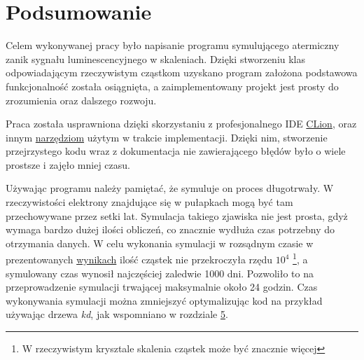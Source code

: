 \chapter{Podsumowanie}

Celem wykonywanej pracy było napisanie programu symulującego atermiczny zanik sygnału luminescencyjnego w skaleniach. Dzięki stworzeniu klas odpowiadającym rzeczywistym cząstkom uzyskano program założona podstawowa funkcjonalność została osiągnięta, a zaimplementowany projekt jest prosty do zrozumienia oraz dalszego rozwoju. 

Praca została usprawniona dzięki skorzystaniu z profesjonalnego IDE \hyperref[tech:clion]{CLion}, oraz innym \hyperref[tech:all]{narzędziom} użytym w trakcie implementacji. Dzięki nim, stworzenie przejrzystego kodu wraz z dokumentacja nie zawierającego błędów było o wiele prostsze i zajęło mniej czasu.

Używając programu należy pamiętać, że symuluje on proces długotrwały. W rzeczywistości elektrony znajdujące się w pułapkach mogą być tam przechowywane przez setki lat. Symulacja takiego zjawiska nie jest prosta, gdyż wymaga bardzo dużej ilości obliczeń, co znacznie wydłuża czas potrzebny do otrzymania danych. W celu wykonania symulacji w rozsądnym czasie w  prezentowanych  \hyperref[wynik:wykres]{wynikach} ilość cząstek nie przekroczyła rzędu $10^{4}$ \footnote[7]{W rzeczywistym krysztale skalenia cząstek może być znacznie więcej}, a symulowany czas wynosił najczęściej zaledwie 1000 dni. Pozwoliło to na przeprowadzenie symulacji trwającej maksymalnie około 24 godzin. Czas wykonywania symulacji można zmniejszyć optymalizując kod na przykład używając drzewa \emph{kd}, jak wspomniano w rozdziale \hyperref[rozwoj:1]{5}. 
